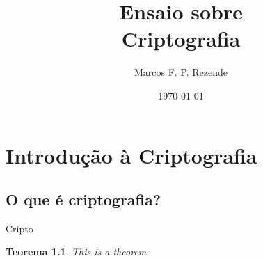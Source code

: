 \documentclass{report}
\title{\Huge{Ensaio sobre}\\Criptografia}
\author{\huge{Marcos F. P. Rezende}}
\date{\today}
\renewcommand{\(}{\left(}
\renewcommand{\)}{\right)}
\newtheorem{theorem}{Teorema}
\begin{document}
\maketitle
\newpage
\tableofcontents
\pagebreak

\chapter{Introdução à Criptografia}\label{ch:intro}
\section{O que é criptografia?}
Cripto
\begin{theorem}
  This is a theorem.
\end{theorem}
\end{document}

